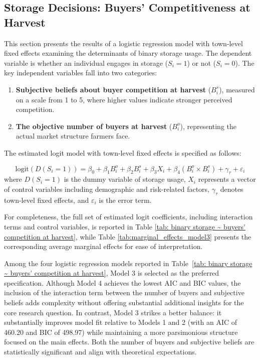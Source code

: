 \subsection{Storage Decisions: Buyers' Competitiveness at Harvest}
\noindent 
This section presents the results of a logistic regression model with town-level fixed effects examining the determinants of binary storage usage. The dependent variable is whether an individual engages in storage ($S_i = 1$) or not ($S_i = 0$). The key independent variables fall into two categories:  
\begin{enumerate}
    \item \textbf{Subjective beliefs about buyer competition at harvest} ($B^s_i$), measured on a scale from 1 to 5, where higher values indicate stronger perceived competition.  
    \item \textbf{The objective number of buyers at harvest} ($B^o_i$), representing the actual market structure farmers face. 
\end{enumerate}
The estimated logit model with town-level fixed effects is specified as follows:

\begin{equation}
\text{logit} \left( D(S_i= 1) \right) = \beta_0 + \beta_1 B^o_i + \beta_2 B^s_i + \beta_3 X_i + \beta_4 (B^o_i \times B^s_i) + \gamma_\tau + \varepsilon_i
\label{Eq: empirical first one}
\end{equation}
where $D(S_i=1)$ is the dummy variable of storage usage, $X_i$ represents a vector of control variables including demographic and risk-related factors, $\gamma_\tau$ denotes town-level fixed effects, and $\varepsilon_i$ is the error term.  




For completeness, the full set of estimated logit coefficients, including interaction terms and control variables, is reported in Table \ref{tab: binary storage ~ buyers' competition at harvest}, while Table \ref{tab:marginal_effects_model3} presents the corresponding average marginal effects for ease of interpretation.  

Among the four logistic regression models reported in Table~\ref{tab: binary storage ~ buyers' competition at harvest}, Model 3 is selected as the preferred specification. Although Model 4 achieves the lowest AIC and BIC values, the inclusion of the interaction term between the number of buyers and subjective beliefs adds complexity without offering substantial additional insights for the core research question. In contrast, Model 3 strikes a better balance: it substantially improves model fit relative to Models 1 and 2 (with an AIC of 460.20 and BIC of 498.97) while maintaining a more parsimonious structure focused on the main effects. Both the number of buyers and subjective beliefs are statistically significant and align with theoretical expectations.

